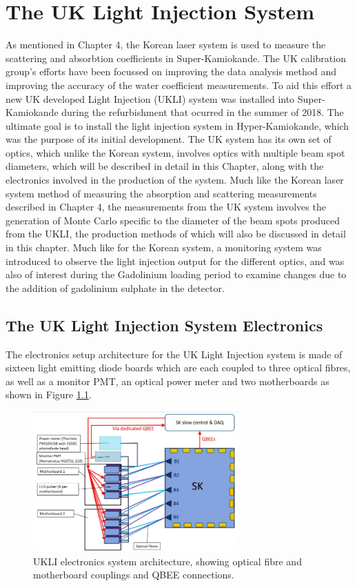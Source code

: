 \chapter{The UK Light Injection System}
\label{chp:ukli}

As mentioned in Chapter 4, the Korean laser system is used to measure the scattering and absorbtion coefficients in Super-Kamiokande. The UK calibration group's efforts have been focussed on improving the data analysis method and improving the accuracy of the water coefficient measurements. To aid this effort a new UK developed Light Injection (UKLI) system was installed into Super-Kamiokande during the refurbishment that ocurred in the summer of 2018. The ultimate goal is to install the light injection system in Hyper-Kamiokande, which was the purpose of its initial development. The UK system has its own set of optics, which unlike the Korean system, involves optics with multiple beam spot diameters, which will be described in detail in this Chapter, along with the electronics involved in the production of the system. Much like the Korean laser system method of measuring the absorption and scattering measurements described in Chapter 4, the measurements from the UK system involves the generation of Monte Carlo specific to the diameter of the beam spots produced from the UKLI, the production methods of which will also be discussed in detail in this chapter. Much like for the Korean system, a monitoring system was introduced to observe the light injection output for the different optics, and was also of interest during the Gadolinium loading period to examine changes due to the addition of gadolinium sulphate in the detector. 

\section{The UK Light Injection System Electronics}

The electronics setup architecture for the UK Light Injection system is made of sixteen light emitting diode boards which are each coupled to three optical fibres, as well as a monitor PMT, an optical power meter and two motherboards as shown in Figure \ref{fig:ukli_system_architecture}. 

\begin{figure}
    \centering
    \includegraphics[width=0.7\textwidth]{Figures/ukli_system_architecture.png}
    \caption{UKLI electronics system architecture, showing optical fibre and motherboard couplings and QBEE connections.}
    \label{fig:ukli_system_architecture}
\end{figure}

